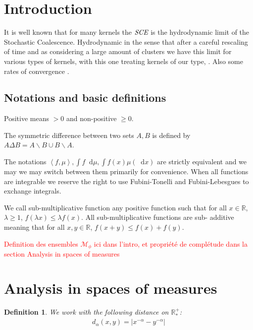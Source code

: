 \documentclass[11pt,a4paper]{article}
\title{}      %
\author{
   Sebastian Baudelet
}
\title{}
\date{}
\newcommand{\RR}{\mathbb{R}}
\newcommand{\RRP}{\mathbb{R}^+_*}
\newcommand{\MC}{\mathcal{M}}
\newcommand{\SCE}{\emph{SCE}}
\newcommand{\red}[1]{\textcolor{red}{#1}}
\newcommand{\brac}[1]{\left\langle#1\right\rangle}
\newcommand{\dd}{\mathop{}\!\mathrm{d}}
\newtheorem{definition}[theorem]{Definition}
\begin{document}
\section{Introduction}

It is well known that for many kernels the \(\SCE\) is the hydrodynamic limit of the Stochastic Coalescence. Hydrodynamic in the sense that after a careful rescaling of time and as considering a large amount of clusters we have this limit for various types of kernels, \cite{norrisClusterCoagulation2000,norris1999smoluchowski,deaconuPureJumpMarkov2002,deaconu2000smoluchowski,fournierConvergenceMarcusLushnikov2004,fournierStochasticCoalescenceHomogeneouslike2009} with this one treating kernels of our type, \cite{norris1999smoluchowski}. Also some rates of convergence \cite{cepedaSmoluchowskisEquationRate2011a}.

\subsection{Notations and basic definitions}
Positive means $> 0$ and non-positive $\geq 0$. 

The symmetric difference between two sets $A,B$ is defined by $A\Delta B = A\backslash B \cup B\backslash A$.

The notations $\brac{f,\mu}, \int f\dd \mu, \int f(x)\mu(\dd x)$ are strictly equivalent and we may we may switch between them primarily for convenience. When all functions are integrable we reserve the right to use Fubini-Tonelli and Fubini-Lebesgues to exchange integrals.

We call sub-multiplicative function any positive function such that for all $x \in \RR$, $\lambda \geq 1$, $f(\lambda x) \leq \lambda f(x)$. All sub-multiplicative functions are sub- additive meaning that for all $x,y \in \RR$, $f(x+y) \leq f(x) + f(y)$.

\red{Definition des ensembles $\MC_{\phi}$ ici dans l'intro, et propriété de complétude dans la section Analysis in spaces of measures}
\section{Analysis in spaces of measures}

\begin{definition}
    We work with the following distance on $\RRP$:
    \begin{align*}
        d_\alpha(x,y) = | x^{-\alpha} - y^{-\alpha}|
    \end{align*}
\end{definition}
\end{document}
